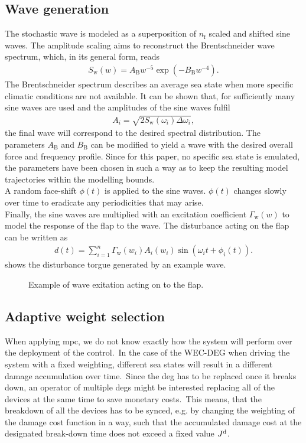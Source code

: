 \subsection{Wave generation}
The stochastic wave is modeled as a superposition of $n_\mathrm{f}$ scaled and shifted sine waves. The amplitude scaling aims to reconstruct the Brentschneider wave spectrum, which, in its general form, reads
\begin{align*}
S_\mathrm{w}(w)=A_\mathrm{B} w^{-5} \exp \left(-B_\mathrm{B} w^{-4}\right).
\end{align*}
The Brentschneider spectrum describes an average sea state when more specific climatic conditions are not available. 
It can be shown that, for sufficiently many sine waves are used and the amplitudes of the sine waves fulfil
\begin{align*}
A_i=\sqrt{2 S_\mathrm{w}(\omega_i) \Delta \omega_i},
\end{align*}
the final wave will correspond to the desired spectral distribution.
The parameters $A_\mathrm{B}$ and $B_\mathrm{B}$ can be modified to yield a wave with the desired overall force and frequency profile. Since for this paper, no specific sea state is emulated, the parameters have been chosen in such a way as to keep the resulting model trajectories within the modelling bounds.\\
A random face-shift $\phi(t)$ is applied to the sine waves. 
$\phi(t)$ changes slowly over time to eradicate any periodicities that may arise. 
\\
Finally, the sine waves are multiplied with an excitation coefficient $\Gamma_\mathrm{w}(w)$ to model the response of the flap to the wave. 
The disturbance acting on the flap can be written as 
\begin{align*}
    d(t)=\sum_{i = 1}^{n} \Gamma_{\mathrm{w}}(w_i) A_i(w_i) \sin \left(\omega_i t+\phi_i(t)\right).
\end{align*}
 shows the disturbance torgue generated by an example wave.
\begin{figure}[htb]
	\centering
	\fontsize{8}{0}\selectfont
	\def\svgwidth{0.49\textwidth}
	
	\caption{Example of wave exitation acting on to the flap.}
	\label{fig:ExampleWave}
\end{figure}

\subsection{Adaptive weight selection}
When applying \ac{mpc}, we do not know exactly how the system will perform over the deployment of the control.\ 
In the case of the WEC-DEG when driving the system with a fixed weighting, different sea states will result in a different damage accumulation over time.\ 
Since the \ac{deg} has to be replaced once it breaks down, an operator of multiple \acp{deg} might be interested replacing all of the devices at the same time to save monetary costs.\ 
This means, that the breakdown of all the devices has to be synced, e.g. by changing the weighting of the damage cost function in a way, such that the accumulated damage cost at the designated break-down time \tbd does not exceed a fixed value $J^\mathrm{d}$.\ 


